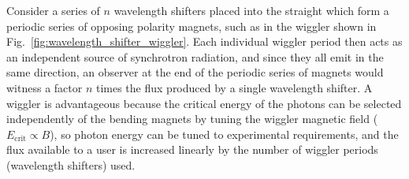 \documentclass[../main.tex]{subfiles}
\begin{document}
Consider a series of $n$ wavelength shifters placed into the straight which form a periodic series of opposing polarity magnets, such as in the wiggler shown in Fig.~\ref{fig:wavelength_shifter_wiggler}. Each individual wiggler period then acts as an independent source of synchrotron radiation, and since they all emit in the same direction, an observer at the end of the periodic series of magnets would witness a factor $n$ times the flux produced by a single wavelength shifter. A wiggler is advantageous because the critical energy of the photons can be selected independently of the bending magnets by tuning the wiggler magnetic field ($E_{\mathrm{crit}} \propto B$), so photon energy can be tuned to experimental requirements, and the flux available to a user is increased linearly by the number of wiggler periods (wavelength shifters) used.
\end{document}
